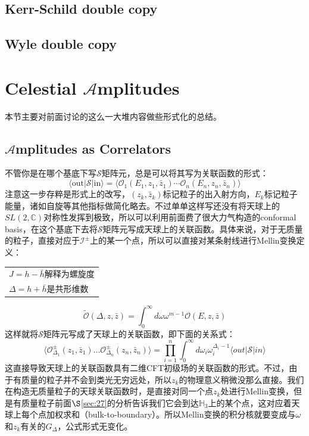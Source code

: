 \subsection{Kerr-Schild double copy}
\subsection{Wyle double copy}
\section{Celestial $\mathcal{A}$mplitudes}
本节主要对前面讨论的这么一大堆内容做些形式化的总结。
\subsection{$\mathcal{A}$mplitudes as Correlators}
不管你是在哪个基底下写$\mathcal{S}$矩阵元，总是可以将其写为关联函数的形式：
\begin{equation}
	\boxed{
		\langle\text{out}|\mathcal{S}|\text{in}\rangle=\langle\mathcal{O}_1(E_1,z_1,\bar{z}_1)\cdots\mathcal{O}_n(E_n,z_n,\bar{z}_n)\rangle
	}
\end{equation}
注意这一步存粹是形式上的改写，$(z_k,\bar z_k)$标记粒子的出入射方向，$E_k$标记粒子能量，诸如自旋等其他指标做简化略去。不过单单这样写还没有将天球上的$SL(2,\mathbb{C})$对称性发挥到极致，所以可以利用前面费了很大力气构造的conformal basis，在这个基底下去将$\mathcal{S}$矩阵元写成天球上的关联函数。具体来说，对于无质量的粒子，直接对应于$\mathcal{I}^\pm$上的某一个点，所以可以直接对某条射线进行Mellin变换定义：\begin{margintable}\footnotesize 
	\begin{tabularx}{\marginparwidth}{|X}
		$J=h-\bar h$解释为螺旋度\\
		$\Delta = h+\bar h$是共形维数\\
	\end{tabularx}
\end{margintable}
\begin{equation}
	\tilde{\mathcal{O}}(\Delta,z,\bar{z})=\int_0^\infty d\omega\omega^{m-1}\mathcal{O}(E,z,\bar{z})
\end{equation}
这样就将$\mathcal{S}$矩阵元写成了天球上的关联函数，即下面的关系式：
\begin{equation}
	\boxed{
		\langle\mathcal{O}_{\Delta_1}^{\pm}(z_1,\bar{z}_1)\ldots\mathcal{O}_{\Delta_n}^{\pm}(z_n,\bar{z}_n)\rangle=\prod_{i=1}^{n}\int_0^{\infty}d\omega_i\omega_i^{\Delta_i-1}\langle out|\mathcal{S}|in\rangle 
	}
\end{equation}
这直接导致天球上的关联函数具有二维CFT初级场的关联函数的形式。不过，由于有质量的粒子并不会到类光无穷远处，所以$z_k$的物理意义稍微没那么直接。我们在构造无质量粒子的天球关联函数时，是直接对同一个点$z_k$处进行Mellin变换，但是有质量粒子前面$\S $\ref{sec:27}的分析告诉我们它会到达$\mathbb{H}_3$上的某个点，这对应着天球上每个点加权求和（bulk-to-boundary）。所以Mellin变换的积分核就要变成与$\omega$和$z_k$有关的$G_\Delta$，公式形式无变化。
